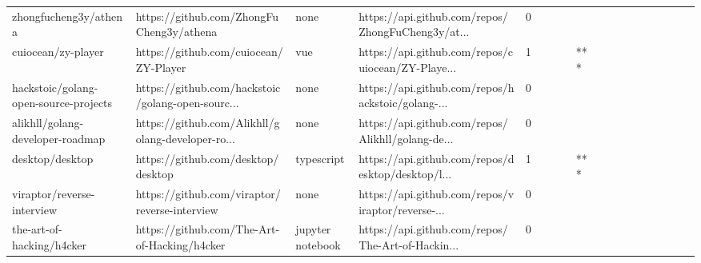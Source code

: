 \begin{tabular}{llllrlllllllllllll}
zhongfucheng3y/athena                              &           https://github.com/ZhongFuCheng3y/athena &              none &  https://api.github.com/repos/ZhongFuCheng3y/at... &       0 &         &        &           &                &                 &        &           &           &          &          &       &              &          \\
cuiocean/zy-player                                 &              https://github.com/cuiocean/ZY-Player &               vue &  https://api.github.com/repos/cuiocean/ZY-Playe... &       1 &         &        &           &            *** &                 &        &           &           &          &          &       &              &          \\
hackstoic/golang-open-source-projects              &  https://github.com/hackstoic/golang-open-sourc... &              none &  https://api.github.com/repos/hackstoic/golang-... &       0 &         &        &           &                &                 &        &           &           &          &          &       &              &          \\
alikhll/golang-developer-roadmap                   &  https://github.com/Alikhll/golang-developer-ro... &              none &  https://api.github.com/repos/Alikhll/golang-de... &       0 &         &        &           &                &                 &        &           &           &          &          &       &              &          \\
desktop/desktop                                    &                 https://github.com/desktop/desktop &        typescript &  https://api.github.com/repos/desktop/desktop/l... &       1 &         &        &           &            *** &                 &        &           &           &          &          &       &              &          \\
viraptor/reverse-interview                         &      https://github.com/viraptor/reverse-interview &              none &  https://api.github.com/repos/viraptor/reverse-... &       0 &         &        &           &                &                 &        &           &           &          &          &       &              &          \\
the-art-of-hacking/h4cker                          &       https://github.com/The-Art-of-Hacking/h4cker &  jupyter notebook &  https://api.github.com/repos/The-Art-of-Hackin... &       0 &         &        &           &                &                 &        &           &           &          &          &       &              &          \\

\end{tabular}
